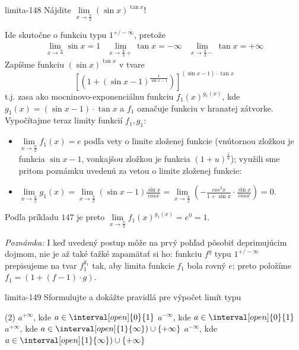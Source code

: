 \begin{defproblem}{limita-148}
Nájdite $\lim\limits_{x \rightarrow \frac{\pi}{2}} (\sin x)^{\tan x}$!

\begin{solution}
    Ide skutočne o funkciu typu $1^{+/- \infty}$, pretože
    \begin{align*}
        \lim\limits_{x \rightarrow \frac{\pi}{}} \sin x=1
        & \lim\limits_{x \rightarrow \frac{\pi}{2}+} \tan x=-\infty
        & \lim\limits_{x \rightarrow \frac{\pi}{2}-} \tan x=+\infty
    \end{align*}
    Zapíšme funkciu $(\sin x)^{\tan x}$ v tvare
    \[
        [(1+(\sin x-1)^{\frac{1}{\sin x-1}})]^{(\sin x-1)\cdot \tan x}
    \]
    t.j. zasa ako mocninovo-exponenciálnu funkciu $f_1(x)^{g_1(x)}$, kde
    $g_1(x)=(\sin x-1)\cdot \tan x$ a $f_1$ označuje funkciu v hranatej
    zátvorke. Vypočítajme teraz limity funkcií $f_1, g_1$:
    \begin{itemize}
    \item $\lim\limits_{x \rightarrow \frac{\pi}{2}} f_1(x)=e$ podľa vety o
        limite zloženej funkcie (vnútornou zložkou je funkcia $\sin x-1$,
        vonkajšou zložkou je funkcia $(1+u)^{\frac{1}{u}}$); využili sme pritom
        poznámku uvedenú za vetou o limite zloženej funkcie:
    \item $\lim\limits_{x \rightarrow \frac{\pi}{2}}g_1(x)=\lim\limits_{x
        \rightarrow \frac{\pi}{2}} (\sin x-1)\frac{\sin x}{cos x}=\lim\limits_{x
        \rightarrow \frac{\pi}{2}} (-\frac{cos ^2 x}{1+\sin x}\cdot \frac{\sin
        x}{cos x})=0$.
    \end{itemize}
    Podľa príkladu $147$ je preto $\lim\limits_{x \rightarrow \frac{\pi}{2}}
    f_1(x)^{g_1(x)}=e^0=1$.

    \textit{Poznámka:}
    I keď uvedený postup môže na prvý pohľad pôsobiť deprimujúcim dojmom, nie je
    až také ťažké zapamätať si ho: funkciu $f^g$ typu $1^{+/- \infty}$
    prepisujeme na tvar $f_1^{g_1}$ tak, aby limita funkcie $f_1$ bola rovný
    $e$; preto položíme $f_1=(1+(f-1)\cdot g)$.
\end{solution}
\end{defproblem}

\begin{defproblem}{limita-149}
Sformulujte a dokážte pravidlá pre výpočet limít typu
\begin{tasks}(2)
    \task $a^{+\infty}$, kde $a \in \interval[open]{0}{1}$
    \task $a^{-\infty}$, kde $a \in \interval[open]{0}{1}$
    \task $a^{+\infty}$, kde $a \in \interval[open]{1}{\infty}) \cup \{+\infty \}$
    \task $a^{-\infty}$, kde $a \in \interval[open]{1}{\infty}) \cup \{+\infty \}$
\end{tasks}
\end{defproblem}

